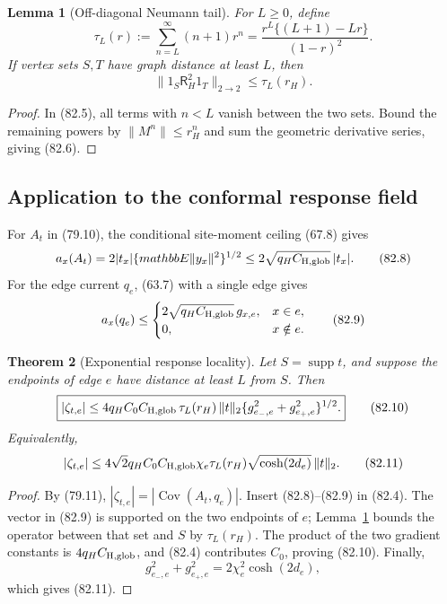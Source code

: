 \documentclass[11pt]{article}
\newtheorem{theorem}{Theorem}[section]
\newtheorem{lemma}[theorem]{Lemma}
\theoremstyle{remark}
\begin{document}
\begin{lemma}[Off-diagonal Neumann tail]
\label{lem:v17v82-tail}
For \(L\geq0\), define
\[
 \tau_L(r)
 :=\sum_{n=L}^\infty(n+1)r^n
 =\frac{r^L\{(L+1)-Lr\}}{(1-r)^2}.               \tag{82.6}
\]
If vertex sets \(S,T\) have graph distance at least \(L\), then
\[
 \|1_S\mathsf R_H^2 1_T\|_{2\to2}
 \leq\tau_L(r_H).                                 \tag{82.7}
\]
\end{lemma}

\begin{proof}
In (82.5), all terms with \(n<L\) vanish between the two sets.
Bound the remaining powers by \(\|M^n\|\leq r_H^n\) and sum the
geometric derivative series, giving (82.6).
\end{proof}

\subsection{Application to the conformal response field}

For \(A_t\) in (79.10), the conditional site-moment ceiling (67.8)
gives
\[
 a_x(A_t)
 =2|t_x|\{mathbb E\|y_x\|^2\}^{1/2}
 \leq2\sqrt{q_HC_{\rm H,glob}}\,|t_x|.            \tag{82.8}
\]
For the edge current \(q_e\), (63.7) with a single edge gives
\[
 a_x(q_e)
 \leq
 \begin{cases}
 2\sqrt{q_HC_{\rm H,glob}}\,g_{x,e},&x\in e,\\
 0,&x\notin e.
 \end{cases}                                      \tag{82.9}
\]

\begin{theorem}[Exponential response locality]
\label{thm:v17v82-response}
Let \(S=\operatorname{supp}t\), and suppose the endpoints of edge
\(e\) have distance at least \(L\) from \(S\).  Then
\[
\boxed{
 |\zeta_{t,e}|
 \leq4q_HC_0C_{\rm H,glob}\,
 \tau_L(r_H)\,\|t\|_2
 \{g_{e_-,e}^2+g_{e_+,e}^2\}^{1/2}.}             \tag{82.10}
\]
Equivalently,
\[
 |\zeta_{t,e}|
 \leq4\sqrt2q_HC_0C_{\rm H,glob}\chi_e
 \tau_L(r_H)\sqrt{\cosh(2d_e)}\,\|t\|_2.         \tag{82.11}
\]
\end{theorem}

\begin{proof}
By (79.11),
\(|\zeta_{t,e}|=|\operatorname{Cov}(A_t,q_e)|\).
Insert (82.8)--(82.9) in (82.4).  The vector in (82.9) is supported on
the two endpoints of \(e\); Lemma~\ref{lem:v17v82-tail} bounds the
operator between that set and \(S\) by \(\tau_L(r_H)\).  The product
of the two gradient constants is
\(4q_HC_{\rm H,glob}\), and (82.4) contributes \(C_0\), proving
(82.10).  Finally,
\[
 g_{e_-,e}^2+g_{e_+,e}^2
 =2\chi_e^2\cosh(2d_e),                           \tag{82.12}
\]
which gives (82.11).
\end{proof}
\end{document}
